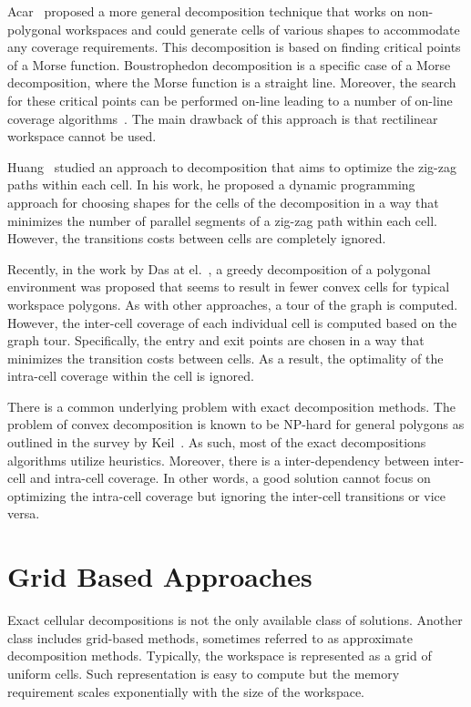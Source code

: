\documentclass[../main.tex]{subfiles}
\begin{document}
Acar~\cite{Acar2002morse} proposed a more general decomposition technique that works on non-polygonal workspaces and could generate cells of various shapes to accommodate any coverage requirements. This decomposition is based on finding critical points of a Morse function. Boustrophedon decomposition is a specific case of a Morse decomposition, where the Morse function is a straight line. Moreover, the search for these critical points can be performed on-line leading to a number of on-line coverage algorithms~\cite{acar2002sensor}. The main drawback of this approach is that rectilinear workspace cannot be used. 

Huang~\cite{Huang2001optimal} studied an approach to decomposition that aims to optimize the zig-zag paths within each cell. In his work, he proposed a dynamic programming approach for choosing shapes for the cells of the decomposition in a way that minimizes the number of parallel segments of a zig-zag path within each cell. However, the transitions costs between cells are completely ignored.

Recently, in the work by Das at el.~\cite{das2014mapping}, a greedy decomposition of a polygonal environment was proposed that seems to result in fewer convex cells for typical workspace polygons. As with other approaches, a tour of the graph is computed. However, the inter-cell coverage of each individual cell is computed based on the graph tour. Specifically, the entry and exit points are chosen in a way that minimizes the transition costs between cells. As a result, the optimality of the intra-cell coverage within the cell is ignored.

There is a common underlying problem with exact decomposition methods. The problem of convex decomposition is known to be NP-hard for general polygons as outlined in the survey by Keil~\cite{keil2000polygon}. As such, most of the exact decompositions algorithms utilize heuristics. Moreover, there is a inter-dependency between inter-cell and intra-cell coverage. In other words, a good solution cannot focus on optimizing the intra-cell coverage but ignoring the inter-cell transitions or vice versa.

\section{Grid Based Approaches}
\label{section:grid_based_approaches}

Exact cellular decompositions is not the only available class of solutions. Another class includes grid-based methods, sometimes referred to as approximate decomposition methods. Typically, the workspace is represented as a grid of uniform cells. Such representation is easy to compute but the memory requirement scales exponentially with the size of the workspace.
\end{document}
